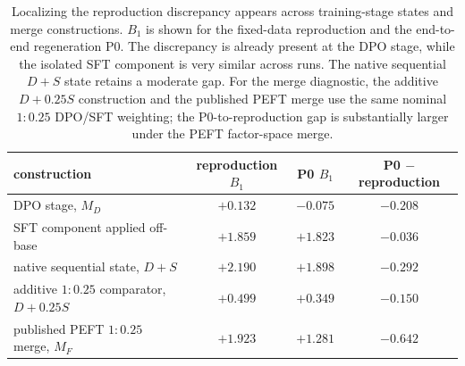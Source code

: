 \begin{table}[t]
\centering
\small
\begin{tabular}{lccc}
\toprule
construction & reproduction $B_1$ & P0 $B_1$ & P0 $-$ reproduction \\
\midrule
DPO stage, $M_D$ & $+0.132$ & $-0.075$ & $-0.208$ \\
SFT component applied off-base & $+1.859$ & $+1.823$ & $-0.036$ \\
native sequential state, $D+S$ & $+2.190$ & $+1.898$ & $-0.292$ \\
additive $1{:}0.25$ comparator, $D+0.25S$ & $+0.499$ & $+0.349$ & $-0.150$ \\
published PEFT $1{:}0.25$ merge, $M_F$ & $+1.923$ & $+1.281$ & $-0.642$ \\
\bottomrule
\end{tabular}
\caption{
Localizing the reproduction discrepancy appears across training-stage states and merge constructions.
$B_1$ is shown for the fixed-data reproduction and the end-to-end regeneration P0.
The discrepancy is already present at the DPO stage, while the isolated SFT component is very similar across runs.
The native sequential $D+S$ state retains a moderate gap.
For the merge diagnostic, the additive $D+0.25S$ construction and the published PEFT merge use the same nominal $1{:}0.25$ DPO/SFT weighting; the P0-to-reproduction gap is substantially larger under the PEFT factor-space merge.
}
\label{tab:paraphrase-stage}
\end{table}